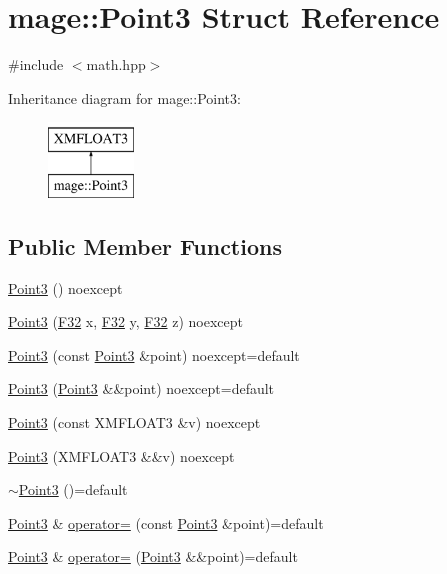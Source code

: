 \hypertarget{structmage_1_1_point3}{}\section{mage\+:\+:Point3 Struct Reference}
\label{structmage_1_1_point3}


{\ttfamily \#include $<$math.\+hpp$>$}

Inheritance diagram for mage\+:\+:Point3\+:\begin{figure}[H]
\begin{center}
\leavevmode
\includegraphics[height=2.000000cm]{structmage_1_1_point3}
\end{center}
\end{figure}
\subsection*{Public Member Functions}
\begin{DoxyCompactItemize}
\item 
\hyperlink{structmage_1_1_point3_aab371cb187cadc61b81e5d09c8eed1e5}{Point3} () noexcept
\item 
\hyperlink{structmage_1_1_point3_af7e50841e6bec16661a2de6c74dc9498}{Point3} (\hyperlink{namespacemage_aa97e833b45f06d60a0a9c4fc22ae02c0}{F32} x, \hyperlink{namespacemage_aa97e833b45f06d60a0a9c4fc22ae02c0}{F32} y, \hyperlink{namespacemage_aa97e833b45f06d60a0a9c4fc22ae02c0}{F32} z) noexcept
\item 
\hyperlink{structmage_1_1_point3_a06dfbaee1e7bc857d95c60ce970eb9bd}{Point3} (const \hyperlink{structmage_1_1_point3}{Point3} \&point) noexcept=default
\item 
\hyperlink{structmage_1_1_point3_a42d100496c00031d597f00da9057b221}{Point3} (\hyperlink{structmage_1_1_point3}{Point3} \&\&point) noexcept=default
\item 
\hyperlink{structmage_1_1_point3_a301b7497bfdc583b0157d4dcb10e0984}{Point3} (const X\+M\+F\+L\+O\+A\+T3 \&v) noexcept
\item 
\hyperlink{structmage_1_1_point3_a56b75e7d5d8803ffd2c3b11f087816d1}{Point3} (X\+M\+F\+L\+O\+A\+T3 \&\&v) noexcept
\item 
\hyperlink{structmage_1_1_point3_a952151b6ff72b68569f95445c2ac2495}{$\sim$\+Point3} ()=default
\item 
\hyperlink{structmage_1_1_point3}{Point3} \& \hyperlink{structmage_1_1_point3_a9b2178183cdb9e8d1ab6eaf9702b0786}{operator=} (const \hyperlink{structmage_1_1_point3}{Point3} \&point)=default
\item 
\hyperlink{structmage_1_1_point3}{Point3} \& \hyperlink{structmage_1_1_point3_ab3a12f78a196535f25269e1288b10a06}{operator=} (\hyperlink{structmage_1_1_point3}{Point3} \&\&point)=default
\end{DoxyCompactItemize}


